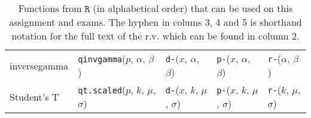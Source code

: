 \begin{table}[htp]
\begin{tabular}{l | llll}
inversegamma & \texttt{qinvgamma}($p$, $\alpha$, $\beta$) 
& \texttt{d-}($x$, $\alpha$, $\beta$)
& \texttt{p-}($x$, $\alpha$, $\beta$) 
& \texttt{r-}($\alpha$, $\beta$) \\




Student's T & \texttt{qt.scaled}($p$, $k$, $\mu$, $\sigma$) 
& \texttt{d-}($x$, $k$, $\mu$, $\sigma$)
& \texttt{p-}($x$, $k$, $\mu$, $\sigma$) 
& \texttt{r-}($k$, $\mu$, $\sigma$) \\



\end{tabular}
\caption{Functions from $\texttt{R}$ (in alphabetical order) that can be used on this assignment and exams. The hyphen in colums 3, 4 and 5 is shorthand notation for the full text of the r.v. which can be found in column 2.
}
\label{tab:eqs}
\end{table}